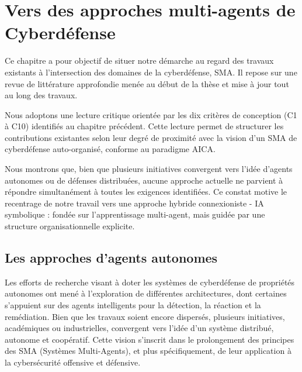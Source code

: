 \documentclass[ twoside,openright,titlepage,numbers=noenddot,headinclude,%
                footinclude=true,cleardoublepage=empty,abstractoff, %
                BCOR=5mm,paper=a4,fontsize=11pt,%
                french,american,%
                ]{scrreprt}
\begin{document}
\chapter{Vers des approches multi-agents de Cyberdéfense}

\noindent
Ce chapitre a pour objectif de situer notre démarche au regard des travaux existants à l'intersection des domaines de la cyberdéfense, SMA. Il repose sur une revue de littérature approfondie menée au début de la thèse et mise à jour tout au long des travaux.

Nous adoptons une lecture critique orientée par les dix critères de conception (C1 à C10) identifiés au chapitre précédent. Cette lecture permet de structurer les contributions existantes selon leur degré de proximité avec la vision d'un SMA de cyberdéfense auto-organisé, conforme au paradigme AICA.

Nous montrons que, bien que plusieurs initiatives convergent vers l'idée d'agents autonomes ou de défenses distribuées, aucune approche actuelle ne parvient à répondre simultanément à toutes les exigences identifiées. Ce constat motive le recentrage de notre travail vers une approche hybride connexioniste - IA symbolique : fondée sur l'apprentissage multi-agent, mais guidée par une structure organisationnelle explicite.

\section{Les approches d'agents autonomes}\label{sec:revue-cyberdef-agent}

Les efforts de recherche visant à doter les systèmes de cyberdéfense de propriétés autonomes ont mené à l'exploration de différentes architectures, dont certaines s'appuient sur des agents intelligents pour la détection, la réaction et la remédiation. Bien que les travaux soient encore dispersés, plusieurs initiatives, académiques ou industrielles, convergent vers l'idée d'un système distribué, autonome et coopératif. Cette vision s'inscrit dans le prolongement des principes des SMA (Systèmes Multi-Agents), et plus spécifiquement, de leur application à la cybersécurité offensive et défensive.
\end{document}
